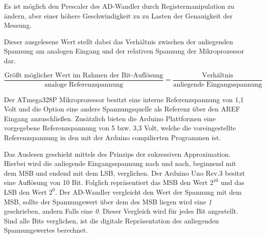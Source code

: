 Es ist  möglich den Prescaler des AD-Wandler durch Registermanipulation zu ändern\cite{atmel_corporation_atmega48a/pa/88a/pa/168a/pa/328/p_2014}, aber einer höhere Geschwindigkeit zu zu Lasten der Genauigkeit der Messung.

Dieser ausgelesene Wert stellt dabei das Verhältnis zwischen der anliegenden Spannung am analogen Eingang und der relativen Spannung der Mikroprozessor dar.
\begin{center}
  \begin{equation}
  \label{eq: Formel zur Berechnung der anligenden Spannung in Relation zur Referenzspannung}
    \frac{\text{Größt möglicher Wert im Rahmen der Bit-Auflösung}}{\text{analoge Referenzspannung}} = \frac{\text{Verhältnis}}{\text{anliegende Eingangsspannung}}
  \end{equation}
\end{center}
Der ATmega328P Mikroprozessor besitzt eine interne Referenzspannung von 1,1 Volt und die Option eine andere Spannungsquelle als Referenz über den AREF Eingang anzuschließen\cite{atmel_corporation_atmega48a/pa/88a/pa/168a/pa/328/p_201}. Zusätzlich bieten die Arduino Plattformen eine vorgegebene Referenzspannung von 5 bzw. 3,3 Volt\cite{_arduino_2015-1}, welche die voreingestellte Referenzspannung in den mit der Arduino  compilierten Programmen ist.


Das Auslesen geschieht mittels des Prinzips der sukzessiven Approximation. Hierbei wird die anliegende Eingangsspannung nach und nach, beginnend mit dem MSB und endend mit dem LSB, verglichen. Der Arduino Uno Rev.3 besitzt eine Auflösung von 10 Bit. Folglich repräsentiert das MSB den Wert $2^{10}$ und das LSB den Wert $2^{0}$.
Der AD-Wandler vergleicht den Wert der Spannung mit dem MSB, sollte der Spannungswert über dem des MSB liegen wird eine \textit{1} geschrieben, andern Falls eine \textit{0}. Dieser Vergleich wird für jedes Bit angestellt. Sind alle Bits verglichen, ist die digitale Repräsentation des anliegenden Spannungswertes berechnet.

